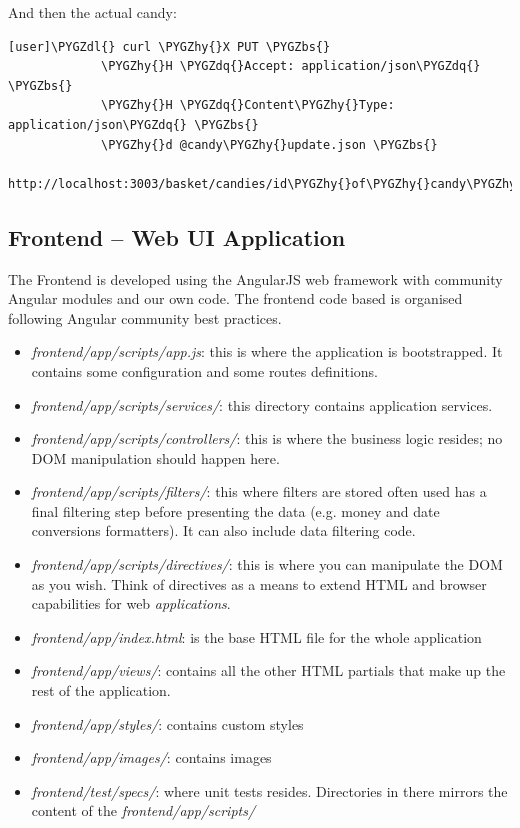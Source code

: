 \documentclass[letterpaper,10pt,english]{sphinxmanual}
\def\PYGZbs{\char`\\}
\def\PYGZdl{\char`\$}
\def\PYGZhy{\char`\-}
\def\PYGZdq{\char`\"}
\begin{document}
And then the actual candy:

\begin{Verbatim}[commandchars=\\\{\}]
[user]\PYGZdl{} curl \PYGZhy{}X PUT \PYGZbs{}
             \PYGZhy{}H \PYGZdq{}Accept: application/json\PYGZdq{}  \PYGZbs{}
             \PYGZhy{}H \PYGZdq{}Content\PYGZhy{}Type: application/json\PYGZdq{} \PYGZbs{}
             \PYGZhy{}d @candy\PYGZhy{}update.json \PYGZbs{}
             http://localhost:3003/basket/candies/id\PYGZhy{}of\PYGZhy{}candy\PYGZhy{}in\PYGZhy{}couchdb
\end{Verbatim}


\subsection{Frontend -- Web UI Application}
\label{developer-guide:frontend-web-ui-application}
The Frontend is developed using the AngularJS web framework with
community Angular modules and our own code. The frontend code based is
organised following Angular community best practices.
\begin{itemize}
\item {} 
\emph{frontend/app/scripts/app.js}: this is where the application is bootstrapped. It contains
some configuration and some routes definitions.

\item {} 
\emph{frontend/app/scripts/services/}: this directory contains application services.

\item {} 
\emph{frontend/app/scripts/controllers/}: this is where the business
logic resides; no DOM manipulation should happen here.

\item {} 
\emph{frontend/app/scripts/filters/}: this where filters are stored often used has a final
filtering step before presenting the data (e.g. money and date
conversions formatters). It can also include data filtering code.

\item {} 
\emph{frontend/app/scripts/directives/}: this is where you can manipulate the DOM as you
wish. Think of directives as a means to extend HTML and browser
capabilities for web \emph{applications}.

\item {} 
\emph{frontend/app/index.html}: is the base HTML file for the whole
application

\item {} 
\emph{frontend/app/views/}: contains all the other HTML partials that
make up the rest of the application.

\item {} 
\emph{frontend/app/styles/}: contains custom styles

\item {} 
\emph{frontend/app/images/}: contains images

\item {} 
\emph{frontend/test/specs/}: where unit tests resides. Directories in there
mirrors the content of the \emph{frontend/app/scripts/}

\end{itemize}
\end{document}
